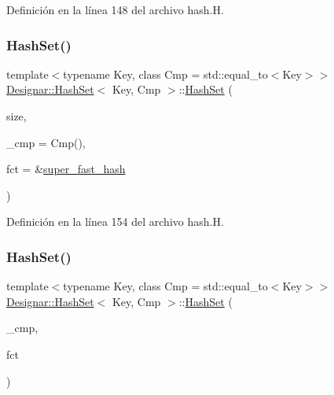 Definición en la línea 148 del archivo hash.\+H.

\mbox{\label{class_designar_1_1_hash_set_a007cbe70f94c249ccebaf68006bbf0f4}} 
\subsubsection{\texorpdfstring{Hash\+Set()}{HashSet()}\hspace{0.1cm}{\footnotesize\ttfamily [5/12]}}
{\footnotesize\ttfamily template$<$typename Key, class Cmp = std\+::equal\+\_\+to$<$\+Key$>$$>$ \\
\hyperlink{class_designar_1_1_hash_set}{Designar\+::\+Hash\+Set}$<$ Key, Cmp $>$\+::\hyperlink{class_designar_1_1_hash_set}{Hash\+Set} (\begin{DoxyParamCaption}\item[{\hyperlink{namespace_designar_aa72662848b9f4815e7bf31a7cf3e33d1}{nat\+\_\+t}}]{size,  }\item[{Cmp \&\&}]{\+\_\+cmp = {\ttfamily Cmp()},  }\item[{\hyperlink{class_designar_1_1_hash_set_a7a8b0a4970519ebc9ccc1ad247d0639f}{Hash\+Fct\+Ptr}}]{fct = {\ttfamily \&\hyperlink{namespace_designar_afd5712d16b3ae1c1c7d59f1004cd96fd}{super\+\_\+fast\+\_\+hash}} }\end{DoxyParamCaption})\hspace{0.3cm}{\ttfamily [inline]}}



Definición en la línea 154 del archivo hash.\+H.

\mbox{\label{class_designar_1_1_hash_set_a12dce6e775ae60019e189297040e2cbf}} 
\subsubsection{\texorpdfstring{Hash\+Set()}{HashSet()}\hspace{0.1cm}{\footnotesize\ttfamily [6/12]}}
{\footnotesize\ttfamily template$<$typename Key, class Cmp = std\+::equal\+\_\+to$<$\+Key$>$$>$ \\
\hyperlink{class_designar_1_1_hash_set}{Designar\+::\+Hash\+Set}$<$ Key, Cmp $>$\+::\hyperlink{class_designar_1_1_hash_set}{Hash\+Set} (\begin{DoxyParamCaption}\item[{Cmp \&}]{\+\_\+cmp,  }\item[{\hyperlink{class_designar_1_1_hash_set_a05d8d111665c25bc17290c01fa299398}{Hash\+Fct\+Type}}]{fct }\end{DoxyParamCaption})\hspace{0.3cm}{\ttfamily [inline]}}




